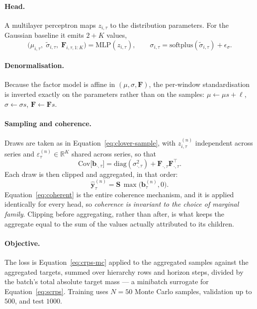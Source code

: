 \documentclass[11pt]{article}
\newcommand{\bvec}{\mathbf{b}}
\newcommand{\yvec}{\mathbf{y}}
\newcommand{\Smat}{\mathbf{S}}
\newcommand{\Fmat}{\mathbf{F}}
\newcommand{\Real}{\mathbb{R}}
\begin{document}
\paragraph{Head.} A multilayer perceptron maps $z_{i,\tau}$ to the distribution
parameters. For the Gaussian baseline it emits $2+K$ values,
\begin{equation}
\bigl(\mu_{i,\tau},\; \tilde\sigma_{i,\tau},\; \Fmat_{i,\tau,1:K}\bigr)
= \mathrm{MLP}(z_{i,\tau}),
\qquad
\sigma_{i,\tau} = \mathrm{softplus}(\tilde\sigma_{i,\tau}) + \epsilon_\sigma .
\end{equation}

\paragraph{Denormalisation.} Because the factor model is affine in
$(\mu, \sigma, \Fmat)$, the per-window standardisation is inverted exactly on the
parameters rather than on the samples:
$\mu \leftarrow \mu s + \ell$, $\sigma \leftarrow \sigma s$,
$\Fmat \leftarrow \Fmat s$.

\paragraph{Sampling and coherence.} Draws are taken as in
Equation~\eqref{eq:clover-sample}, with $z_{i,\tau}^{(n)}$ independent across series
and $\varepsilon^{(n)}_{\tau} \in \Real^{K}$ shared across series, so that
\begin{equation}
\mathrm{Cov}\bigl[\bvec_{\cdot,\tau}\bigr]
= \mathrm{diag}(\sigma^{2}_{\cdot,\tau}) + \Fmat_{\cdot,\tau}\Fmat_{\cdot,\tau}^{\!\top} .
\label{eq:cov-structure}
\end{equation}
Each draw is then clipped and aggregated, in that order:
\begin{equation}
\hat{\yvec}^{(n)}_{\tau} = \Smat \,\max\bigl(\bvec^{(n)}_{\tau}, 0\bigr).
\label{eq:coherent}
\end{equation}
Equation~\eqref{eq:coherent} is the entire coherence mechanism, and it is applied
identically for every head, so \emph{coherence is invariant to the choice of
marginal family}. Clipping before aggregating, rather than after, is what keeps the
aggregate equal to the sum of the values actually attributed to its children.

\paragraph{Objective.} The loss is Equation~\eqref{eq:crps-mc} applied to the
aggregated samples against the aggregated targets, summed over hierarchy rows and
horizon steps, divided by the batch's total absolute target mass --- a minibatch
surrogate for Equation~\eqref{eq:scrps}. Training uses $N=50$ Monte Carlo samples,
validation up to $500$, and test $1000$.
\end{document}
